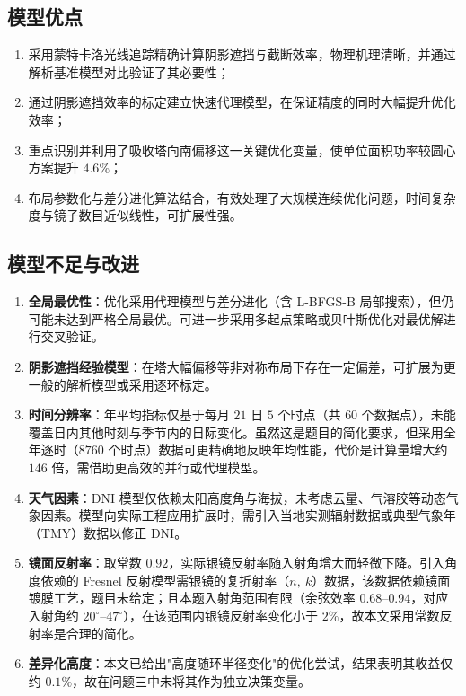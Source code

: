 \documentclass[12pt]{ctexart}
\begin{document}
\subsection{模型优点}
\begin{enumerate}
\item 采用蒙特卡洛光线追踪精确计算阴影遮挡与截断效率，物理机理清晰，并通过解析基准模型对比验证了其必要性；
\item 通过阴影遮挡效率的标定建立快速代理模型，在保证精度的同时大幅提升优化效率；
\item 重点识别并利用了吸收塔向南偏移这一关键优化变量，使单位面积功率较圆心方案提升 $4.6\%$；
\item 布局参数化与差分进化算法结合，有效处理了大规模连续优化问题，时间复杂度与镜子数目近似线性，可扩展性强。
\end{enumerate}

\subsection{模型不足与改进}
\begin{enumerate}
\item \textbf{全局最优性}：优化采用代理模型与差分进化（含 L-BFGS-B 局部搜索），但仍可能未达到严格全局最优。可进一步采用多起点策略或贝叶斯优化对最优解进行交叉验证。
\item \textbf{阴影遮挡经验模型}：在塔大幅偏移等非对称布局下存在一定偏差，可扩展为更一般的解析模型或采用逐环标定。
\item \textbf{时间分辨率}：年平均指标仅基于每月 $21$ 日 $5$ 个时点（共 $60$ 个数据点），未能覆盖日内其他时刻与季节内的日际变化。虽然这是题目的简化要求，但采用全年逐时（$8760$ 个时点）数据可更精确地反映年均性能，代价是计算量增大约 $146$ 倍，需借助更高效的并行或代理模型。
\item \textbf{天气因素}：DNI 模型仅依赖太阳高度角与海拔，未考虑云量、气溶胶等动态气象因素。模型向实际工程应用扩展时，需引入当地实测辐射数据或典型气象年（TMY）数据以修正 DNI。
\item \textbf{镜面反射率}：取常数 $0.92$，实际银镜反射率随入射角增大而轻微下降。引入角度依赖的 Fresnel 反射模型需银镜的复折射率（$n,\ k$）数据，该数据依赖镜面镀膜工艺，题目未给定；且本题入射角范围有限（余弦效率 $0.68$--$0.94$，对应入射角约 $20^\circ$--$47^\circ$），在该范围内银镜反射率变化小于 $2\%$，故本文采用常数反射率是合理的简化。
\item \textbf{差异化高度}：本文已给出"高度随环半径变化"的优化尝试，结果表明其收益仅约 $0.1\%$，故在问题三中未将其作为独立决策变量。
\end{enumerate}
\end{document}
